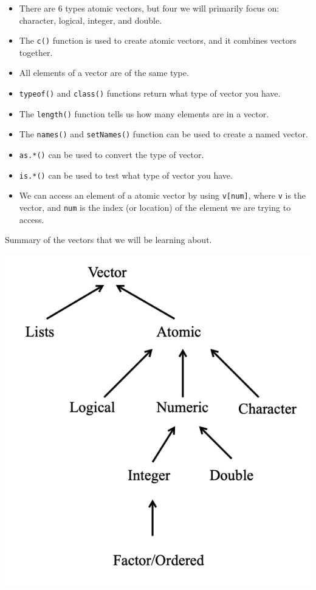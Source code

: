 \documentclass[
]{book}
\begin{document}
\begin{itemize}
\item
  There are 6 types atomic vectors, but four we will primarily focus on: character, logical, integer, and double.
\item
  The \texttt{c()} function is used to create atomic vectors, and it combines vectors together.
\item
  All elements of a vector are of the same type.
\item
  \texttt{typeof()} and \texttt{class()} functions return what type of vector you have.
\item
  The \texttt{length()} function tells us how many elements are in a vector.
\item
  The \texttt{names()} and \texttt{setNames()} function can be used to create a named vector.
\item
  \texttt{as.*()} can be used to convert the type of vector.
\item
  \texttt{is.*()} can be used to test what type of vector you have.
\item
  We can access an element of a atomic vector by using \texttt{v{[}num{]}}, where \texttt{v} is the vector, and \texttt{num} is the index (or location) of the element we are trying to access.
\end{itemize}

Summary of the vectors that we will be learning about.

\begin{center}\includegraphics[width=8in]{images/Vector_chart} \end{center}
\end{document}
